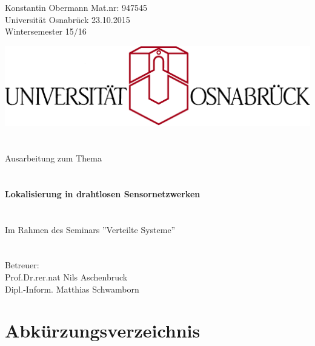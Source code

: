 \documentclass[12pt, a4wide]{scrreprt}
\begin{document}
\noindent
Konstantin Obermann \hfill Mat.nr: 947545\\
Universität Osnabrück \hfill 23.10.2015\\
Wintersemester 15/16\\
\thispagestyle{empty}
\begin{center}
\includegraphics[scale=.9]{uos_proper.png}
\section*{}
{\LARGE Ausarbeitung zum Thema}\\
\section*{}
{\Huge {\bf Lokalisierung in drahtlosen Sensornetzwerken}}\\
\section*{}
{\Large Im Rahmen des Seminars ''Verteilte Systeme''}\\
\section*{}
{\Large Betreuer:}\\
{\Large Prof.Dr.rer.nat Nils Aschenbruck}\\
{\Large Dipl.-Inform. Matthias Schwamborn}\\
\end{center}


\newpage
\pagestyle{empty}
\section*{Abkürzungsverzeichnis}
 \begin{acronym}
\end{acronym}
\end{document}
